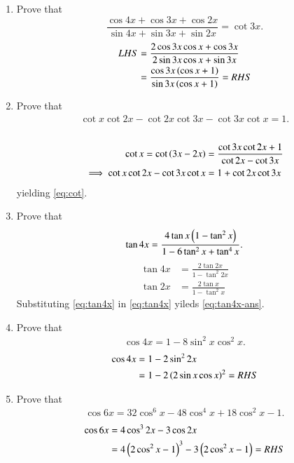 \begin{enumerate}[label=\thesubsection.\arabic*,ref=\thesubsection.\theenumi,itemsep=1ex]
\item Prove that
$$\frac{\cos4x+\cos3x+\cos2x}{\sin4x+\sin3x+\sin2x}=\cot3x.$$
%
\solution
\begin{align}
LHS &= \frac{2\cos3x\cos x+\cos3x}{2\sin3x\cos x+\sin3x}
\\
&= \frac{\cos3x\left(\cos x+1\right)}{\sin3x\left(\cos x+1\right)}
=RHS
\end{align}
\item Prove that
\begin{align}
\cot x\cot2x-\cot2x\cot3x-\cot3x\cot x=1.
\label{eq:cot}
\end{align}
%
\\
\solution
\begin{align}
	\cot x  = \cot\left(3x-2x\right) &= \frac{\cot 3x \cot 2x +1}{\cot 2x - \cot 3x}
	\\
	\implies 
\cot x\cot2x-\cot3x\cot x &=1+\cot2x\cot3x
\end{align}
yielding  
\eqref{eq:cot}.
\item Prove that
\begin{align}
\tan4x=\frac{4\tan x\left(1-\tan^{2}x\right)}{1-6\tan^{2}x+\tan^{4}x}.
\label{eq:tan4x-ans}
\end{align}
%
\solution
\begin{align}
\label{eq:tan4x}
\tan 4x &= 
 \frac{2\tan 2x}{1-\tan^{2} 2x}
 \\
\tan 2x &= 
 \frac{2\tan x}{1-\tan^{2} x}
\label{eq:tan2x}
\end{align}
Substituting \eqref{eq:tan4x}
in \eqref{eq:tan4x}
yileds
\eqref{eq:tan4x-ans}.
\item Prove that
\begin{align}
\label{eq:cos4x}
\cos4x=1-8\sin^{2}x\cos^{2}x.
\end{align}
%
\solution
\begin{align}
	\cos 4x  &= 1 - 2 \sin^2 2x
	\\
	&=1 - 2 \left(2 \sin x \cos x\right)^2 = RHS
\end{align}
\item Prove that
\begin{align}
\label{eq:cos6x}
\cos6x=32\cos^{6}x-48\cos^{4}x+18\cos^{2}x-1.
\end{align}
%
\solution
\begin{align}
	\cos 6x&= 4 \cos^3 2x - 3 \cos 2x 
	\\
	&= 4 \left(2 \cos^2 x - 1\right)^3 - 3 \left(2\cos^2 x - 1\right) = RHS
\end{align}


\end{enumerate}

